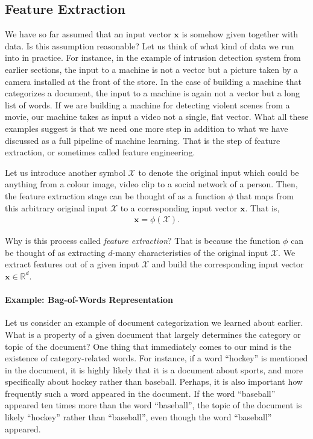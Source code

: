 \documentclass{report}
\newcommand{\vect}[1]{\mathbf{#1}}
\newcommand{\vx}[0]{\vect{x}}
\newcommand{\RR}[0]{\mathbb{R}}
\begin{document}
\subsection{Feature Extraction}

We have so far assumed that an input vector $\vx$ is somehow given together with
data. Is this assumption reasonable? Let us think of what kind of data we run
into in practice. For instance, in the example of intrusion detection system
from earlier sections, the input to a machine is not a vector but a picture
taken by a camera installed at the front of the store. In the case of building a
machine that categorizes a document, the input to a machine is again not a
vector but a long list of words. If we are building a machine for detecting
violent scenes from a movie, our machine takes as input a video not a single,
flat vector. What all these examples suggest is that we need one more step in
addition to what we have discussed as a full pipeline of machine learning. That
is the step of feature extraction, or sometimes called feature engineering.

Let us introduce another symbol $\mathcal{X}$ to denote the original input which
could be anything from a colour image, video clip to a social network of a
person. Then, the feature extraction stage can be thought of as a function
$\phi$ that maps from this arbitrary original input $\mathcal{X}$ to a
corresponding input vector $\vx$. That is,
\begin{align*}
    \vx = \phi(\mathcal{X}).
\end{align*}

Why is this process called {\it feature extraction}? That is because the
function $\phi$ can be thought of as extracting $d$-many characteristics of the
original input $\mathcal{X}$. We extract features out of a given input
$\mathcal{X}$ and build the corresponding input vector $\vx \in \RR^d$.

\paragraph{Example: Bag-of-Words Representation}

Let us consider an example of document categorization we learned about earlier.
What is a property of a given document that largely determines the category or
topic of the document? One thing that immediately comes to our mind is the
existence of category-related words. For instance, if a word ``hockey'' is
mentioned in the document, it is highly likely that it is a document about
sports, and more specifically about hockey rather than baseball. Perhaps, it is
also important how frequently such a word appeared in the document. If the word
``baseball'' appeared ten times more than the word ``baseball'', the topic of
the document is likely ``hockey'' rather than ``baseball'', even though the word
``baseball'' appeared. 
\end{document}
